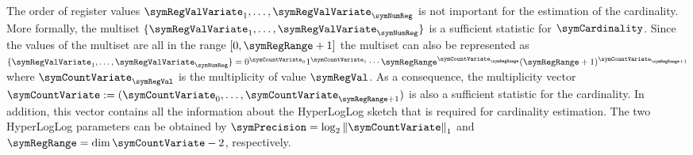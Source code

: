 \documentclass[a4paper]{scrartcl}
\begin{document}
The order of register values $\symRegValVariate_1,\ldots,\symRegValVariate_\symNumReg$ is not important for the estimation of the cardinality. More formally, the multiset $\lbrace\symRegValVariate_1,\ldots,\symRegValVariate_\symNumReg\rbrace$ is a sufficient statistic for $\symCardinality$.
Since the values of the multiset are all in the range $[0, \symRegRange+1]$ the multiset can also be represented as $\lbrace\symRegValVariate_1,\ldots,\symRegValVariate_\symNumReg\rbrace = 0^{\symCountVariate_0}1^{\symCountVariate_1}\cdots\symRegRange^{\symCountVariate_{\symRegRange}}(\symRegRange+1)^{\symCountVariate_{\symRegRange+1}}$ where $\symCountVariate_\symRegVal$ is the multiplicity of value $\symRegVal$. As a consequence, the multiplicity vector $\boldsymbol{\symCountVariate} := (\symCountVariate_0,\ldots,\symCountVariate_{\symRegRange+1})$ is also a sufficient statistic for the cardinality. In addition, this vector contains all the information about the HyperLogLog sketch that is required for cardinality estimation. The two HyperLogLog parameters can be obtained by $\symPrecision = \log_2 \left\Vert\boldsymbol{\symCountVariate}\right\Vert_1$ and $\symRegRange=\dim\boldsymbol{\symCountVariate}-2$, respectively.
\end{document}
